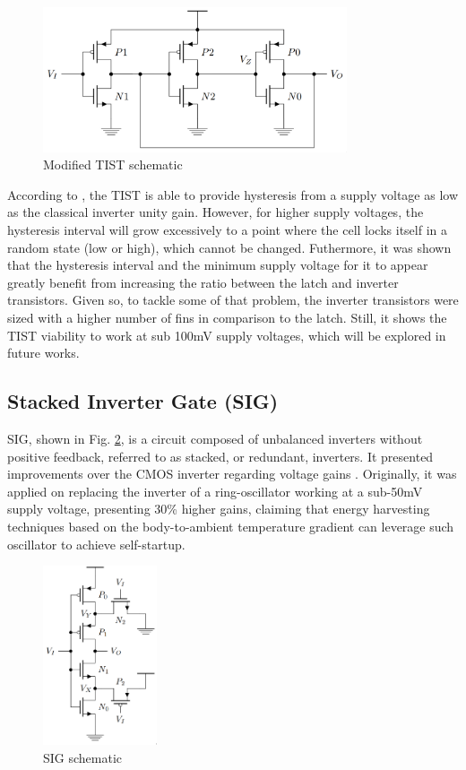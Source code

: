 \documentclass[pgmicro,diss,english]{iiufrgs}
\begin{document}
\begin{figure}[t]
  \centering
    \includegraphics[width=0.8\textwidth, trim={0cm 0cm 0cm 0cm}, clip]{TIST.png}
     \caption{Modified TIST schematic \cite{rabaey2002digital}}
  \label{fig:TIST}
\end{figure}

According to \cite{thiagoTIST}, the TIST is able to provide hysteresis from a supply voltage as low as the classical inverter unity gain. However, for higher supply voltages, the hysteresis interval will grow excessively to a point where the cell locks itself in a random state (low or high), which cannot be changed. Futhermore, it was shown that the hysteresis interval and the minimum supply voltage for it to appear greatly benefit from increasing the ratio between the latch and inverter transistors. Given so, to tackle some of that problem, the inverter transistors were sized with a higher number of fins in comparison to the latch. Still, it shows the TIST viability to work at sub 100mV supply voltages, which will be explored in future works.

\subsection{Stacked Inverter Gate (SIG)}

SIG, shown in Fig. \ref{fig:SIG}, is a circuit composed of unbalanced inverters without positive feedback, referred to as stacked, or redundant, inverters. It presented improvements over the CMOS inverter regarding voltage gains \cite{bose2018stacked, luo2017sub}. Originally, it was applied on replacing the inverter of a ring-oscillator working at a sub-50mV supply voltage, presenting 30\% higher gains, claiming that energy harvesting techniques based on the body-to-ambient temperature gradient can leverage such oscillator to achieve self-startup.

\begin{figure}[]
  \centering
    \includegraphics[width=0.3\textwidth]{SIG.png}
     \caption{SIG schematic \cite{bose2018stacked}}
  \label{fig:SIG}
\end{figure}
\end{document}
